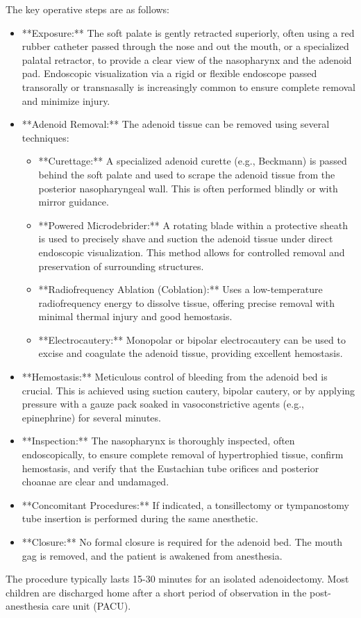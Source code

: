 The key operative steps are as follows:
\begin{itemize}
  \item **Exposure:** The soft palate is gently retracted superiorly, often using a red rubber catheter passed through the nose and out the mouth, or a specialized palatal retractor, to provide a clear view of the nasopharynx and the adenoid pad. Endoscopic visualization via a rigid or flexible endoscope passed transorally or transnasally is increasingly common to ensure complete removal and minimize injury.
  \item **Adenoid Removal:** The adenoid tissue can be removed using several techniques:
    \begin{itemize}
      \item **Curettage:** A specialized adenoid curette (e.g., Beckmann) is passed behind the soft palate and used to scrape the adenoid tissue from the posterior nasopharyngeal wall. This is often performed blindly or with mirror guidance.
      \item **Powered Microdebrider:** A rotating blade within a protective sheath is used to precisely shave and suction the adenoid tissue under direct endoscopic visualization. This method allows for controlled removal and preservation of surrounding structures.
      \item **Radiofrequency Ablation (Coblation):** Uses a low-temperature radiofrequency energy to dissolve tissue, offering precise removal with minimal thermal injury and good hemostasis.
      \item **Electrocautery:** Monopolar or bipolar electrocautery can be used to excise and coagulate the adenoid tissue, providing excellent hemostasis.
    \end{itemize}
  \item **Hemostasis:** Meticulous control of bleeding from the adenoid bed is crucial. This is achieved using suction cautery, bipolar cautery, or by applying pressure with a gauze pack soaked in vasoconstrictive agents (e.g., epinephrine) for several minutes.
  \item **Inspection:** The nasopharynx is thoroughly inspected, often endoscopically, to ensure complete removal of hypertrophied tissue, confirm hemostasis, and verify that the Eustachian tube orifices and posterior choanae are clear and undamaged.
  \item **Concomitant Procedures:** If indicated, a tonsillectomy or tympanostomy tube insertion is performed during the same anesthetic.
  \item **Closure:** No formal closure is required for the adenoid bed. The mouth gag is removed, and the patient is awakened from anesthesia.
\end{itemize}
The procedure typically lasts 15-30 minutes for an isolated adenoidectomy. Most children are discharged home after a short period of observation in the post-anesthesia care unit (PACU).

